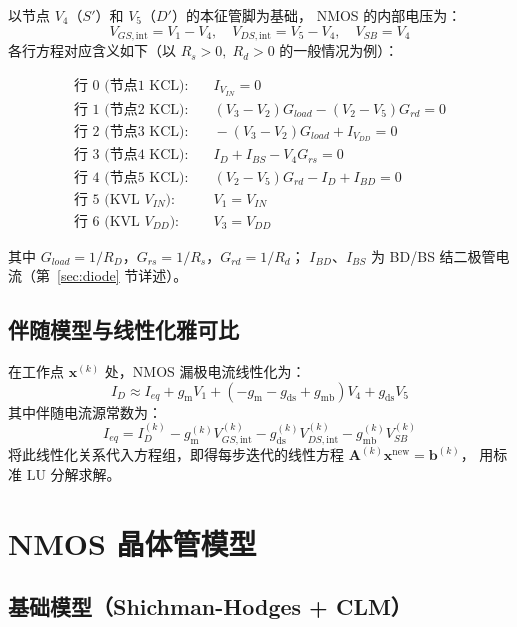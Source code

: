 \documentclass[12pt, a4paper]{article}
\newcommand{\gm}{g_{\mathrm{m}}}
\newcommand{\gds}{g_{\mathrm{ds}}}
\newcommand{\gmb}{g_{\mathrm{mb}}}
\begin{document}
以节点 $V_4$（$S'$）和 $V_5$（$D'$）的本征管脚为基础，
NMOS 的内部电压为：
\[
  V_{GS,\mathrm{int}} = V_1 - V_4,\quad
  V_{DS,\mathrm{int}} = V_5 - V_4,\quad
  V_{SB} = V_4
\]
各行方程对应含义如下（以 $R_s>0,\;R_d>0$ 的一般情况为例）：

\begin{align}
  \text{行 0 (节点1 KCL):}&\quad I_{V_{IN}} = 0 \label{eq:row0}\\
  \text{行 1 (节点2 KCL):}&\quad (V_3-V_2)G_{load} - (V_2-V_5)G_{rd} = 0 \label{eq:row1}\\
  \text{行 2 (节点3 KCL):}&\quad -(V_3-V_2)G_{load} + I_{V_{DD}} = 0 \label{eq:row2}\\
  \text{行 3 (节点4 KCL):}&\quad I_D + I_{BS} - V_4 G_{rs} = 0 \label{eq:row3}\\
  \text{行 4 (节点5 KCL):}&\quad (V_2-V_5)G_{rd} - I_D + I_{BD} = 0 \label{eq:row4}\\
  \text{行 5 (KVL\ }V_{IN}\text{):}&\quad V_1 = V_{IN} \label{eq:row5}\\
  \text{行 6 (KVL\ }V_{DD}\text{):}&\quad V_3 = V_{DD} \label{eq:row6}
\end{align}

其中 $G_{load}=1/R_D$，$G_{rs}=1/R_s$，$G_{rd}=1/R_d$；
$I_{BD}$、$I_{BS}$ 为 BD/BS 结二极管电流（第~\ref{sec:diode} 节详述）。

\subsection{伴随模型与线性化雅可比}

在工作点 $\bm{x}^{(k)}$ 处，NMOS 漏极电流线性化为：
\[
  I_D \approx I_{eq} + \gm V_1 + (-\gm - \gds + \gmb)V_4 + \gds V_5
\]
其中伴随电流源常数为：
\[
  I_{eq} = I_D^{(k)} - \gm^{(k)} V_{GS,\mathrm{int}}^{(k)}
           - \gds^{(k)} V_{DS,\mathrm{int}}^{(k)} - \gmb^{(k)} V_{SB}^{(k)}
\]
将此线性化关系代入方程组，即得每步迭代的线性方程 $\bm{A}^{(k)}\bm{x}^{\mathrm{new}}=\bm{b}^{(k)}$，
用标准 LU 分解求解。

\section{NMOS 晶体管模型}

\subsection{基础模型（Shichman-Hodges + CLM）}
\label{sec:base}
\end{document}
